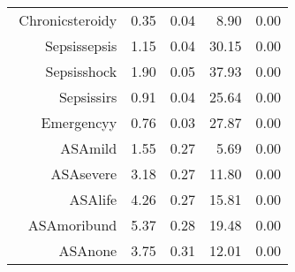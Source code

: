 \begin{tabular}{rrrrr}
$$  Chronic\-steroid\-y & 0.35 & 0.04 & 8.90 & 0.00 \\ 
  Sepsis\-sepsis & 1.15 & 0.04 & 30.15 & 0.00 \\ 
  Sepsis\-shock & 1.90 & 0.05 & 37.93 & 0.00 \\ 
  Sepsis\-sirs & 0.91 & 0.04 & 25.64 & 0.00 \\ 
  Emergency\-y & 0.76 & 0.03 & 27.87 & 0.00 \\ 
  ASA\-mild & 1.55 & 0.27 & 5.69 & 0.00 \\ 
  ASA\-severe & 3.18 & 0.27 & 11.80 & 0.00 \\ 
  ASA\-life & 4.26 & 0.27 & 15.81 & 0.00 \\ 
  ASA\-moribund & 5.37 & 0.28 & 19.48 & 0.00 \\ 
  ASA\-none & 3.75 & 0.31 & 12.01 & 0.00 \\ 
   \hline
\end{tabular}

